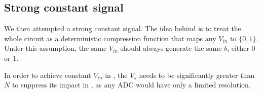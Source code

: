 %
%
%


\subsection{Strong constant signal} \label{Constant}
We then attempted a strong constant signal. The idea behind is to treat the whole circuit as a deterministic compression function that maps any $V_{in}$ to $\{0,1\}$. Under this assumption, the same $V_{in}$ should always generate the same $b$, either $0$ or $1$.

In order to achieve constant $V_{in}$ in , the $V_s$ needs to be significantly greater than $N$ to suppress its impact in , as any ADC would have only a limited resolution.

